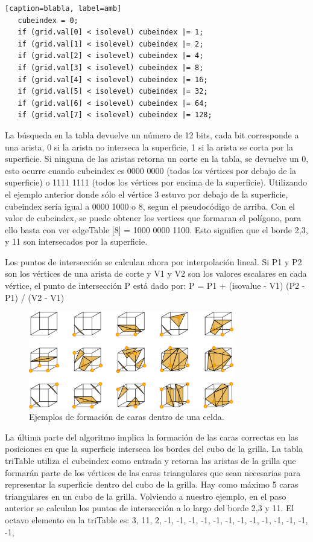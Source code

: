 \documentclass[12pt]{article}
\begin{document}
\begin{lstlisting}[frame=single][caption=blabla, label=amb]
   cubeindex = 0;
   if (grid.val[0] < isolevel) cubeindex |= 1;
   if (grid.val[1] < isolevel) cubeindex |= 2;
   if (grid.val[2] < isolevel) cubeindex |= 4;
   if (grid.val[3] < isolevel) cubeindex |= 8;
   if (grid.val[4] < isolevel) cubeindex |= 16;
   if (grid.val[5] < isolevel) cubeindex |= 32;
   if (grid.val[6] < isolevel) cubeindex |= 64;
   if (grid.val[7] < isolevel) cubeindex |= 128;
\end{lstlisting}

La búsqueda en la tabla devuelve un número de 12 bits, cada bit corresponde a una arista, 0 si la arista no interseca la superficie, 1 si la arista se corta por la superficie. Si ninguna de las aristas retorna un corte en la tabla, se devuelve un 0, esto ocurre cuando cubeindex es 0000 0000 (todos los vértices por debajo de la superficie) o 1111 1111 (todos los vértices por encima de la superficie).
Utilizando el ejemplo anterior donde sólo el vértice 3 estuvo por debajo de la superficie, cubeindex sería igual a 0000 1000 o 8, segun el pseudocódigo de arriba. Con el valor de cubeindex, se puede obtener los vertices que formaran el polígono, para ello basta con ver edgeTable [8] = 1000 0000 1100. Esto significa que el borde 2,3, y 11 son intersecados por la superficie.

Los puntos de intersección se calculan ahora por interpolación lineal. Si P1 y P2 son los vértices de una arista de corte y V1 y V2 son los valores escalares en cada vértice, el punto de intersección P está dado por:
P = P1 + (isovalue - V1) (P2 - P1) / (V2 - V1)
\begin{figure}[h!]
\includegraphics[width=0.8\textwidth,center]{marchingcubes3.png}
\caption{Ejemplos de formación de caras dentro de una celda.}
\end{figure}

La última parte del algoritmo implica la formación de las caras correctas en las posiciones en que la superficie interseca los bordes del cubo de la grilla. La tabla triTable utiliza el cubeindex como entrada y retorna las aristas de la grilla que  formarán parte de los vértices de las caras triangulares que sean necesarias para representar la superficie dentro del cubo de la grilla. Hay como máximo 5 caras triangulares en un cubo de la grilla.
Volviendo a nuestro ejemplo, en el paso anterior se calculan los puntos de intersección a lo largo del borde 2,3 y 11. El octavo elemento en la triTable es:
{3, 11, 2, -1, -1, -1, -1, -1, -1, -1, -1, -1, -1, -1, -1, -1},
\end{document}
